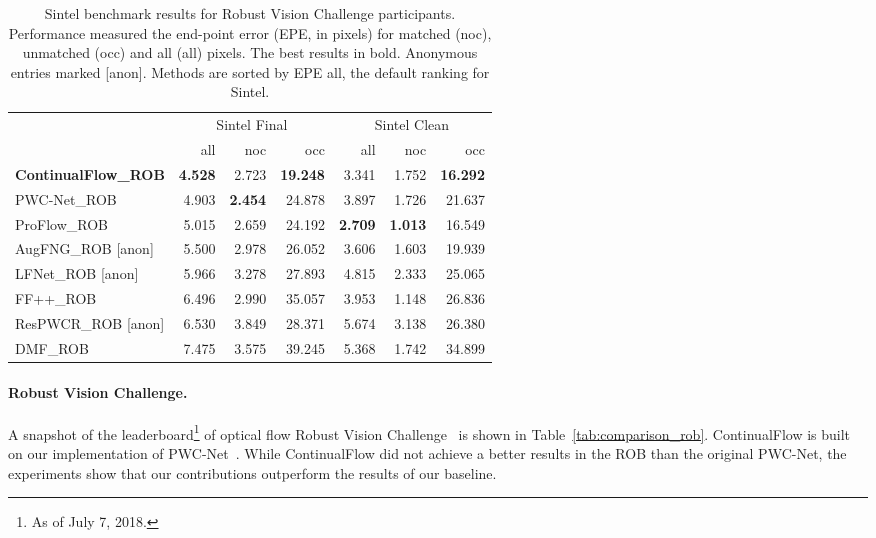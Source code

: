 \documentclass[runningheads]{llncs}
\begin{document}
\begin{table}[]
\caption{Sintel benchmark results for Robust Vision Challenge participants.
Performance measured the end-point error (EPE, in pixels) for matched (noc), unmatched (occ) and all (all) pixels.
The best results in bold.
Anonymous entries marked {[}anon{]}.
Methods are sorted by EPE all, the default ranking for Sintel.
}
\label{tab:comparison_sintel}
\centering
\begin{adjustbox}{max width=\textwidth}
\begin{tabular}{l|rrr|rrr}
 & \multicolumn{3}{c|}{Sintel Final} & \multicolumn{3}{c}{Sintel Clean} \\
 & all & noc & occ & all & noc & occ \\ \hline
\textbf{ContinualFlow\_ROB} & \textbf{4.528} & 2.723 & \textbf{19.248} & 3.341 & 1.752 & \textbf{16.292}\\
PWC-Net\_ROB~\cite{Sun2017} & 4.903 & \textbf{2.454} & 24.878 & 3.897 & 1.726 & 21.637 \\
ProFlow\_ROB~\cite{Maurer2018} & 5.015 & 2.659 & 24.192 & \textbf{2.709} & \textbf{1.013} & 16.549 \\
AugFNG\_ROB {[}anon{]} & 5.500 & 2.978 & 26.052 & 3.606 & 1.603 & 19.939 \\
LFNet\_ROB {[}anon{]} & 5.966 & 3.278 & 27.893 & 4.815 & 2.333 & 25.065 \\
FF++\_ROB~\cite{Schuster2018a} & 6.496 & 2.990 & 35.057 & 3.953 & 1.148 & 26.836 \\
ResPWCR\_ROB {[}anon{]} & 6.530 & 3.849 & 28.371 & 5.674 & 3.138 & 26.380 \\
DMF\_ROB~\cite{Weinzaepfel2013} & 7.475 & 3.575 & 39.245 & 5.368 & 1.742 & 34.899 \\
\end{tabular}
\end{adjustbox}
\end{table}









\paragraph{\bf\textbf{Robust Vision Challenge.}}
A snapshot of the leaderboard\footnote{As of July 7, 2018.} of optical flow Robust Vision Challenge~\cite{RVC2018} is shown in Table~\ref{tab:comparison_rob}.
ContinualFlow is built on our implementation of PWC-Net~\cite{Sun2017}. 
While ContinualFlow did not achieve a better results in the ROB than the original PWC-Net, the experiments show that our contributions outperform the results of our baseline. 
\end{document}
